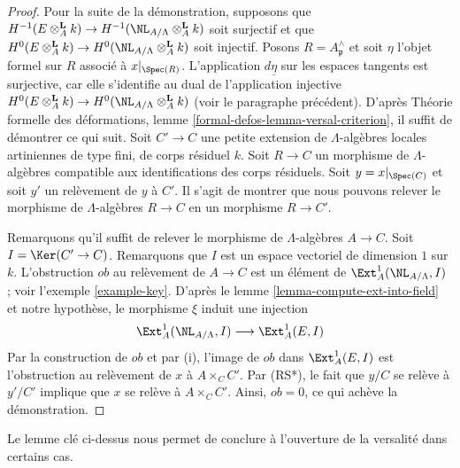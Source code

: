 \begin{proof}
\medskip\noindent
Pour la suite de la démonstration, supposons que
$H^{-1}(E \otimes_A^\mathbf{L} k) \to
H^{-1}(\NL_{A/\Lambda} \otimes_A^\mathbf{L} k)$ soit surjectif et que
$H^0(E \otimes_A^\mathbf{L} k) \to
H^0(\NL_{A/\Lambda} \otimes_A^\mathbf{L} k)$
soit injectif. Posons $R = A_\mathfrak p^\wedge$ et soit $\eta$ l'objet formel
sur $R$ associé à $x|_{\Spec(R)}$. L'application $d\underline{\eta}$ sur les
espaces tangents est surjective, car elle s'identifie au dual de l'application
injective
$H^0(E \otimes_A^{\mathbf{L}} k) \to
H^0(\NL_{A/\Lambda} \otimes_A^{\mathbf{L}} k)$
(voir le paragraphe précédent). D'après Théorie formelle des déformations,
lemme \ref{formal-defos-lemma-versal-criterion}, il suffit de démontrer ce qui
suit. Soit $C' \to C$ une petite extension de $\Lambda$-algèbres locales
artiniennes de type fini, de corps résiduel $k$. Soit $R \to C$ un morphisme
de $\Lambda$-algèbres compatible aux identifications des corps résiduels. Soit
$y = x|_{\Spec(C)}$ et soit $y'$ un relèvement de $y$ à $C'$. Il s'agit de
montrer que nous pouvons relever le morphisme de $\Lambda$-algèbres
$R \to C$ en un morphisme $R \to C'$.

\medskip\noindent
Remarquons qu'il suffit de relever le morphisme de $\Lambda$-algèbres
$A \to C$. Soit $I = \Ker(C' \to C)$. Remarquons que $I$ est un espace
vectoriel de dimension $1$ sur $k$. L'obstruction $ob$ au relèvement de
$A \to C$ est un élément de $\Ext^1_A(\NL_{A/\Lambda}, I)$ ; voir l'exemple
\ref{example-key}. D'après le lemme \ref{lemma-compute-ext-into-field} et notre
hypothèse, le morphisme $\xi$ induit une injection
$$
\Ext^1_A(\NL_{A/\Lambda}, I)
\longrightarrow
\Ext^1_A(E, I)
$$
Par la construction de $ob$ et par (i), l'image de $ob$ dans
$\Ext^1_A(E, I)$ est l'obstruction au relèvement de $x$ à $A \times_C C'$.
Par (RS*), le fait que $y/C$ se relève à $y'/C'$ implique que $x$ se relève à
$A \times_C C'$. Ainsi, $ob = 0$, ce qui achève la démonstration.
\end{proof}

\noindent
Le lemme clé ci-dessus nous permet de conclure à l'ouverture de la versalité
dans certains cas.

